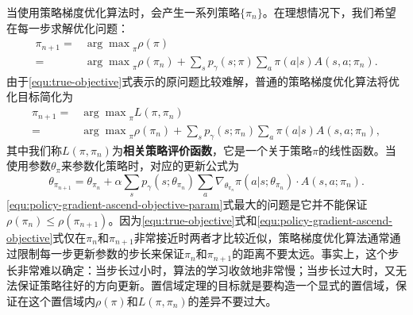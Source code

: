 当使用策略梯度优化算法时，会产生一系列策略$\{\pi_n\}$。在理想情况下，我们希望在每一步求解优化问题：
\begin{equation}\label{equ:true-objective}
    \begin{aligned}
    \pi_{n+1} =& {\arg\max}_{\pi} \rho(\pi) \\
    =& {\arg\max}_{\pi} \rho(\pi_n) + 
        \sum_{s} p_{\gamma}(s; \pi) \sum_a \pi(a \vert s) A (s, a; \pi_n).
    \end{aligned}
\end{equation}
由于\eqref{equ:true-objective}式表示的原问题比较难解，普通的策略梯度优化算法将优化目标简化为
\begin{equation}\label{equ:policy-gradient-ascend-objective}
    \begin{aligned}
    \pi_{n+1} =& {\arg\max}_{\pi} L(\pi, \pi_n) \\ 
    =& {\arg\max}_{\pi} \rho(\pi_n) + \sum_{s} p_{\gamma}(s; \pi_n) \sum_a \pi(a \vert s) A (s, a; \pi_n),
    \end{aligned}
\end{equation}
其中我们称$L(\pi, \pi_n)$为\textbf{相关策略评价函数}，它是一个关于策略$\pi$的线性函数。当使用参数$\theta_\pi$来参数化策略时，对应的更新公式为
\begin{equation}\label{equ:policy-gradient-ascend-objective-param}
    \theta_{\pi_{n+1}} = \theta_{\pi_n} + \alpha \sum_{s} p_{\gamma}(s; \theta_{\pi_n}) \sum_a \nabla_{\theta_{\pi_n}}\pi(a \vert s; \theta_{\pi_n}) \cdot A (s, a; \pi_n).
\end{equation}
\eqref{equ:policy-gradient-ascend-objective-param}式最大的问题是它并不能保证$\rho(\pi_n) \le \rho(\pi_{n+1})$。因为\eqref{equ:true-objective}式和\eqref{equ:policy-gradient-ascend-objective}式仅在$\pi_n$和$\pi_{n+1}$非常接近时两者才比较近似，策略梯度优化算法通常通过限制每一步更新参数的步长来保证$\pi_n$和$\pi_{n+1}$的距离不要太远。事实上，这个步长非常难以确定：当步长过小时，算法的学习收敛地非常慢；当步长过大时，又无法保证策略往好的方向更新。置信域定理的目标就是要构造一个显式的置信域，保证在这个置信域内$\rho(\pi)$和$L(\pi, \pi_n)$的差异不要过大。

